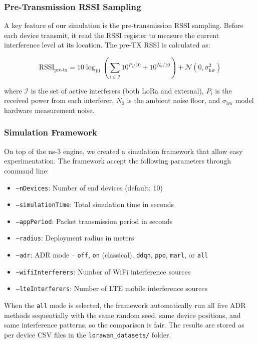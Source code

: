 \documentclass[12pt,a4paper]{article}
\begin{document}
\subsubsection{Pre-Transmission RSSI Sampling}

A key feature of our simulation is the pre-transmission RSSI sampling. Before each device transmit, it read the RSSI register to measure the current interference level at its location. The pre-TX RSSI is calculated as:

\begin{equation}
    \text{RSSI}_{\text{pre-tx}} = 10\log_{10}\left(\sum_{i \in \mathcal{I}} 10^{P_{i}/10} + 10^{N_0/10}\right) + \mathcal{N}(0, \sigma_{\text{hw}}^2)
    \label{eq:pre_tx_rssi}
\end{equation}

where $\mathcal{I}$ is the set of active interferers (both LoRa and external), $P_i$ is the received power from each interferer, $N_0$ is the ambient noise floor, and $\sigma_{\text{hw}}$ model hardware measurement noise.

\subsubsection{Simulation Framework}

On top of the ns-3 engine, we created a simulation framework that allow easy experimentation. The framework accept the following parameters through command line:

\begin{itemize}
    \item \texttt{--nDevices}: Number of end devices (default: 10)
    \item \texttt{--simulationTime}: Total simulation time in seconds
    \item \texttt{--appPeriod}: Packet transmission period in seconds
    \item \texttt{--radius}: Deployment radius in meters
    \item \texttt{--adr}: ADR mode -- \texttt{off}, \texttt{on} (classical), \texttt{ddqn}, \texttt{ppo}, \texttt{marl}, or \texttt{all}
    \item \texttt{--wifiInterferers}: Number of WiFi interference sources
    \item \texttt{--lteInterferers}: Number of LTE mobile interference sources
\end{itemize}

When the \texttt{all} mode is selected, the framework automatically run all five ADR methods sequentially with the same random seed, same device positions, and same interference patterns, so the comparison is fair. The results are stored as per device CSV files in the \texttt{lorawan\_datasets/} folder.
\end{document}
